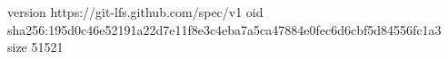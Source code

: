 version https://git-lfs.github.com/spec/v1
oid sha256:195d0c46e52191a22d7e11f8e3c4eba7a5ca47884e0fec6d6cbf5d84556fc1a3
size 51521
